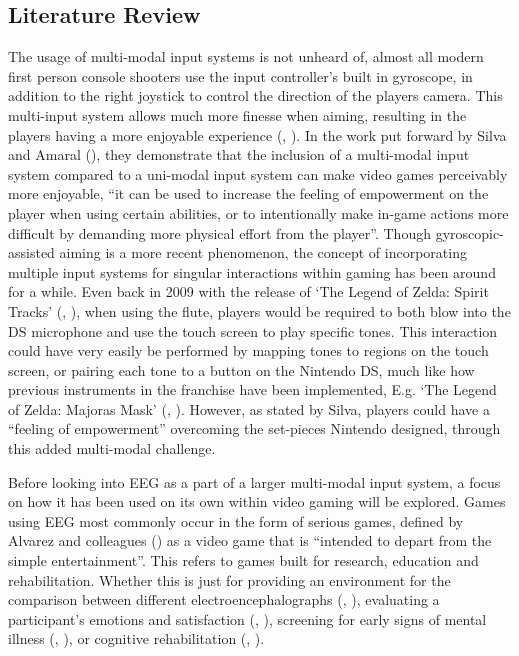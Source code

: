 \documentclass[11pt, a4paper]{article}
\newcommand{\ccite}[1]{(\citeauthor{#1}, \citeyear{#1})}
\newcommand{\cciteyear}[1]{(\citeyear{#1})}
\begin{document}
\subsection{Literature Review}	%
The usage of multi-modal input systems is not unheard of, almost all modern first person console shooters use the input controller's built in gyroscope, in addition to the right joystick to control the direction of the players camera. This multi-input system allows much more finesse when aiming, resulting in the players having a more enjoyable experience \ccite{toktacs2019evaluation}. In the work put forward by Silva and Amaral \cciteyear{da2014multimodal}, they demonstrate that the inclusion of a multi-modal input system compared to a uni-modal input system can make video games perceivably more enjoyable, ``it can be used to increase the feeling of empowerment on the player when using certain abilities, or to intentionally make in-game actions more difficult by demanding more physical effort from the player''. Though gyroscopic-assisted aiming is a more recent phenomenon, the concept of incorporating multiple input systems for singular interactions within gaming has been around for a while. Even back in 2009 with the release of `The Legend of Zelda: Spirit Tracks' \ccite{thelegendofzelda_spirittracks}, when using the flute, players would be required to both blow into the DS microphone and use the touch screen to play specific tones. This interaction could have very easily be performed by mapping tones to regions on the touch screen, or pairing each tone to a button on the Nintendo DS, much like how previous instruments in the franchise have been implemented, E.g. `The Legend of Zelda: Majoras Mask' \ccite{thelegendofzelda_majorasmask}. However, as stated by Silva, players could have a ``feeling of empowerment'' overcoming the set-pieces Nintendo designed, through this added multi-modal challenge.

\hfill

Before looking into EEG as a part of a larger multi-modal input system, a focus on how it has been used on its own within video gaming will be explored. Games using EEG most commonly occur in the form of serious games, defined by Alvarez and colleagues \cciteyear{alvarez2011introduction} as a video game that is ``intended to depart from the simple entertainment''. This refers to games built for research, education and rehabilitation. Whether this is just for providing an environment for the comparison between different electroencephalographs \ccite{liarokapis2014comparing}, evaluating a participant's emotions and satisfaction \ccite{vourvopoulos2013brain}, screening for early signs of mental illness \ccite{tarnanas2015comparison}, or cognitive rehabilitation \ccite{alchalcabi2017more}. 
\end{document}
